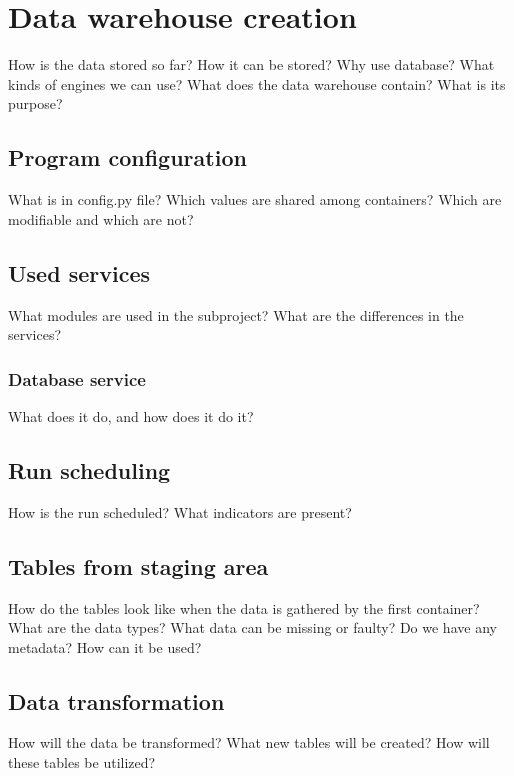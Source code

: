 \chapter{Data warehouse creation}
\label{ch:database}
How is the data stored so far? How it can be stored?
Why use database? What kinds of engines we can use?
What does the data warehouse contain? What is its purpose?


\section{Program configuration}
What is in config.py file? Which values are shared among containers? Which are
modifiable and which are not?


\section{Used services}
What modules are used in the subproject?
What are the differences in the services?

\subsection{Database service}
What does it do, and how does it do it?


\section{Run scheduling}
How is the run scheduled? What indicators are present?


\section{Tables from staging area}
How do the tables look like when the data is gathered by the first container?
What are the data types?
What data can be missing or faulty?
Do we have any metadata? How can it be used?


\section{Data transformation}
How will the data be transformed?
What new tables will be created?
How will these tables be utilized?
